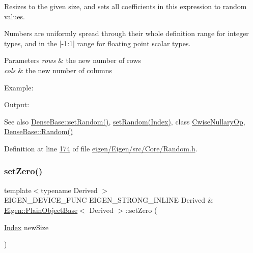 Resizes to the given size, and sets all coefficients in this expression to random values.

Numbers are uniformly spread through their whole definition range for integer types, and in the \mbox{[}-\/1\+:1\mbox{]} range for floating point scalar types.


\begin{DoxyParams}{Parameters}
{\em rows} & the new number of rows \\
\hline
{\em cols} & the new number of columns\\
\hline
\end{DoxyParams}
Example\+: 
\begin{DoxyCodeInclude}
\end{DoxyCodeInclude}
 Output\+: 
\begin{DoxyVerbInclude}
\end{DoxyVerbInclude}


\begin{DoxySeeAlso}{See also}
\hyperlink{group___core___module_ac476e5852129ba32beaa1a8a3d7ee0db}{Dense\+Base\+::set\+Random()}, \hyperlink{class_eigen_1_1_plain_object_base_af0e576a0e1aefc9ee346de44cc352ba3}{set\+Random(\+Index)}, class \hyperlink{group___core___module_class_eigen_1_1_cwise_nullary_op}{Cwise\+Nullary\+Op}, \hyperlink{group___core___module_ae814abb451b48ed872819192dc188c19}{Dense\+Base\+::\+Random()} 
\end{DoxySeeAlso}


Definition at line \hyperlink{eigen_2_eigen_2src_2_core_2_random_8h_source_l00174}{174} of file \hyperlink{eigen_2_eigen_2src_2_core_2_random_8h_source}{eigen/\+Eigen/src/\+Core/\+Random.\+h}.

\mbox{\label{class_eigen_1_1_plain_object_base_ac21ad5f989f320e46958b75ac8d9a1da}} 
\subsubsection{\texorpdfstring{set\+Zero()}{setZero()}\hspace{0.1cm}{\footnotesize\ttfamily [1/2]}}
{\footnotesize\ttfamily template$<$typename Derived $>$ \\
E\+I\+G\+E\+N\+\_\+\+D\+E\+V\+I\+C\+E\+\_\+\+F\+U\+NC E\+I\+G\+E\+N\+\_\+\+S\+T\+R\+O\+N\+G\+\_\+\+I\+N\+L\+I\+NE Derived \& \hyperlink{class_eigen_1_1_plain_object_base}{Eigen\+::\+Plain\+Object\+Base}$<$ Derived $>$\+::set\+Zero (\begin{DoxyParamCaption}\item[{\hyperlink{namespace_eigen_a62e77e0933482dafde8fe197d9a2cfde}{Index}}]{new\+Size }\end{DoxyParamCaption})}

